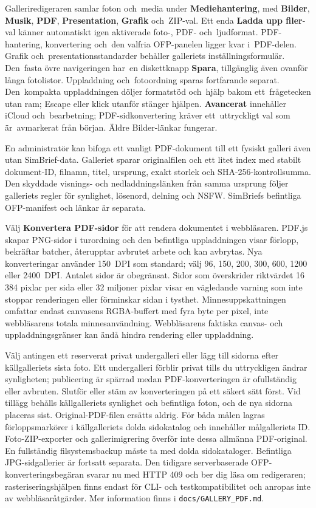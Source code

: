 \documentclass[11pt,a4paper]{article}
\newcommand{\ui}[1]{\textbf{#1}}
\newcommand{\codeword}[1]{\nolinkurl{#1}}
\begin{document}

Galleriredigeraren samlar foton och~media under \ui{Mediehantering}, med
\ui{Bilder}, \ui{Musik}, \ui{PDF}, \ui{Presentation}, \ui{Grafik} och~ZIP-val.
Ett enda \ui{Ladda upp filer}-val känner automatiskt igen aktiverade foto-,
PDF- och~ljudformat. PDF-hantering, konvertering och~den valfria OFP-panelen
ligger kvar i~PDF-delen. Grafik och~presentationsstandarder behåller galleriets
inställningsformulär. Den~fasta övre navigeringen har~en diskettknapp
\ui{Spara}, tillgänglig även ovanför långa fotolistor. Uppladdning
och~fotoordning
sparas fortfarande separat. Den~kompakta uppladdningen döljer formatstöd
och~hjälp
bakom ett~frågetecken utan ram; Escape eller klick utanför stänger hjälpen.
\ui{Avancerat} innehåller iCloud och~bearbetning; PDF-sidkonvertering kräver
ett~uttryckligt val som är~avmarkerat från början. Äldre Bilder-länkar fungerar.

En administratör kan bifoga ett vanligt PDF-dokument till ett fysiskt galleri
även utan SimBrief-data. Galleriet sparar originalfilen och ett litet index med
stabilt dokument-ID, filnamn, titel, ursprung, exakt storlek och
SHA-256-kontrollsumma. Den skyddade visnings- och nedladdningslänken från samma
ursprung följer galleriets regler för synlighet, lösenord, delning och NSFW.
SimBriefs befintliga OFP-manifest och länkar är separata.

Välj \ui{Konvertera PDF-sidor} för att rendera dokumentet i webbläsaren. PDF.js
skapar PNG-sidor i turordning och den befintliga uppladdningen visar förlopp,
bekräftar batcher, återupptar avbrutet arbete och kan avbrytas. Nya
konverteringar använder 150~DPI som standard; välj 96, 150, 200, 300, 600, 1200
eller 2400~DPI. Antalet sidor är obegränsat. Sidor som överskrider riktvärdet
16\,384 pixlar per sida eller 32 miljoner pixlar visar en vägledande varning som
inte stoppar renderingen eller förminskar sidan i tysthet. Minnesuppskattningen
omfattar endast canvasens RGBA-buffert med fyra byte per pixel, inte
webbläsarens totala minnesanvändning. Webbläsarens faktiska canvas- och
uppladdningsgränser kan ändå hindra rendering eller uppladdning.

Välj antingen ett reserverat privat undergalleri eller lägg till sidorna efter
källgalleriets sista foto. Ett undergalleri förblir privat tills du uttryckligen
ändrar synligheten; publicering är spärrad medan PDF-konverteringen är
ofullständig eller avbruten. Slutför eller stäm av konverteringen på ett säkert
sätt först. Vid tillägg behålls källgalleriets synlighet och befintliga foton,
och de nya sidorna placeras sist. Original-PDF-filen ersätts aldrig. För båda
målen lagras förloppsmarkörer i källgalleriets dolda sidokatalog och innehåller
målgalleriets ID. Foto-ZIP-exporter och gallerimigrering överför inte dessa
allmänna PDF-original. En fullständig filsystemsbackup måste ta med dolda
sidokataloger. Befintliga JPG-sidgallerier är fortsatt separata. Den tidigare
serverbaserade OFP-konverteringsbegäran svarar nu med HTTP 409 och ber dig läsa
om redigeraren; rasteriseringshjälpen finns endast för CLI- och
testkompatibilitet och anropas inte av webbläsaråtgärder. Mer information finns
i \codeword{docs/GALLERY\_PDF.md}.
\end{document}
